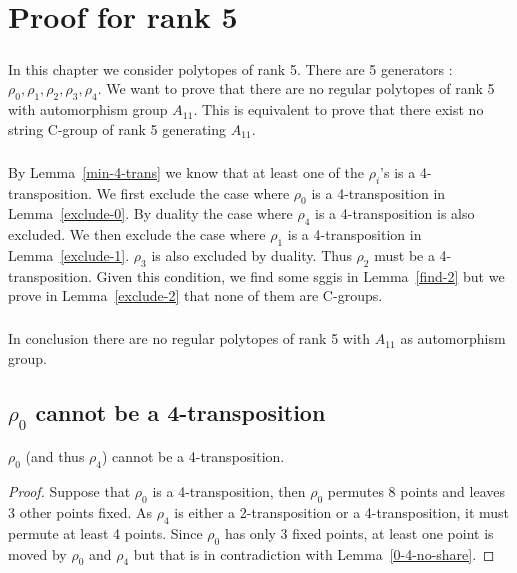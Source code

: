 \chapter{Proof for rank 5}
\label{proof-5}

\paragraph{}
In this chapter we consider polytopes of rank 5. There are 5 generators : $\rho_0, \rho_1, \rho_2, \rho_3, \rho_4$. We want to prove that there are no regular polytopes of rank 5 with automorphism group $A_{11}$. This is equivalent to prove that there exist no string C-group of rank 5 generating $A_{11}$.

\paragraph{}
By Lemma~\ref{min-4-trans} we know that at least one of the $\rho_i$'s is a 4-transposition. We first exclude the case where $\rho_0$ is a 4-transposition in Lemma~\ref{exclude-0}. By duality the case where $\rho_4$ is a 4-transposition is also excluded. We then exclude the case where $\rho_1$ is a 4-transposition in Lemma~\ref{exclude-1}. $\rho_3$ is also excluded by duality. Thus $\rho_2$ must be a 4-transposition. Given this condition, we find some sggis in Lemma~\ref{find-2} but we prove in Lemma~\ref{exclude-2} that none of them are C-groups.

\paragraph{}
In conclusion there are no regular polytopes of rank 5 with $A_{11}$ as automorphism group.

\section{$\rho_0$ cannot be a 4-transposition}

\begin{lemma}
  \label{exclude-0}
  $\rho_0$ (and thus $\rho_4$) cannot be a 4-transposition.
\end{lemma}

\begin{proof}
  Suppose that $\rho_0$ is a 4-transposition, then $\rho_0$ permutes 8 points and leaves 3 other points fixed. As $\rho_4$ is either a 2-transposition or a 4-transposition, it must permute at least 4 points. Since $\rho_0$ has only 3 fixed points, at least one point is moved by $\rho_0$ and $\rho_4$ but that is in contradiction with Lemma~\ref{0-4-no-share}.
\end{proof}
